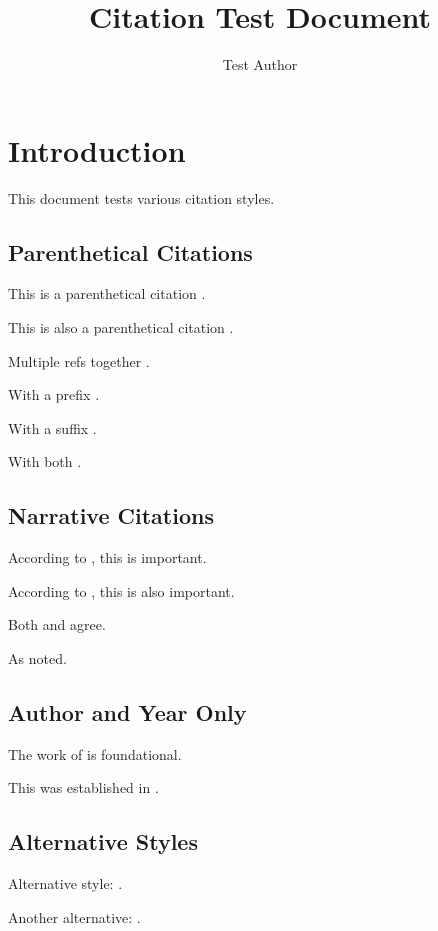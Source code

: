 \documentclass{article}
\title{Citation Test Document}
\author{Test Author}
\begin{document}
\maketitle

\section{Introduction}

This document tests various citation styles.

\subsection{Parenthetical Citations}

This is a parenthetical citation \citep{smith2020}.

This is also a parenthetical citation \parencite{smith2020}.

Multiple refs together \citep{smith2020,jones2021}.

With a prefix \citep[see][]{smith2020}.

With a suffix \citep[][p. 42]{smith2020}.

With both \citep[see][p. 42]{smith2020}.

\subsection{Narrative Citations}

According to \citet{smith2020}, this is important.

According to \textcite{jones2021}, this is also important.

Both \citet{smith2020} and \citet{jones2021} agree.

As \citet[][p. 15]{jones2021} noted.

\subsection{Author and Year Only}

The work of \citeauthor{smith2020} is foundational.

This was established in \citeyear{jones2021}.

\subsection{Alternative Styles}

Alternative style: \citealt{smith2020}.

Another alternative: \citealp{jones2021}.

\printbibliography
\end{document}
